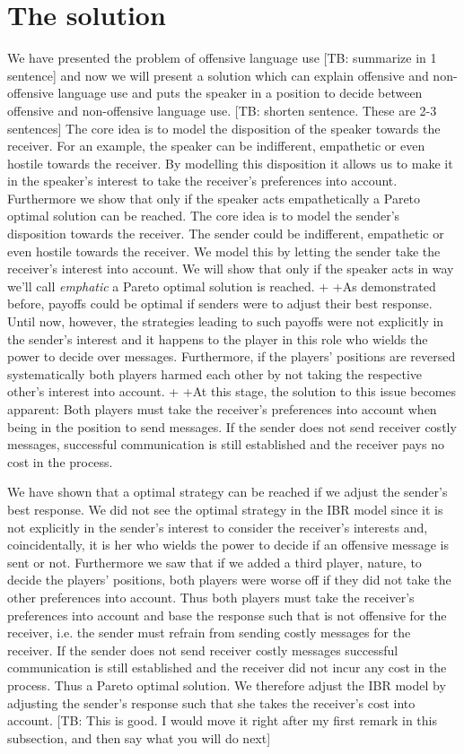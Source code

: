 \documentclass[10pt]{article}
\newcommand{\tb}[1]{\textcolor[rgb]{.8,.33,.0}{[TB: #1]}}%
\begin{document}
\section{The solution}
We have presented the problem of offensive language use \tb{summarize in 1 sentence} and now we will present a solution which can explain offensive and non-offensive language use and puts the speaker in a position to decide between offensive and non-offensive language use. \tb{shorten sentence. These are 2-3 sentences} The core idea is to model the disposition of the speaker towards the receiver. For an example, the speaker can be indifferent, empathetic or even hostile towards the receiver. By modelling this disposition it allows us to make it in the speaker's interest to take the receiver's preferences into account. Furthermore we show that only if the speaker acts empathetically a Pareto optimal solution can be reached.
The core idea is to model the sender's disposition towards the receiver. The sender could be indifferent, empathetic or even hostile towards the receiver. We model this by letting the sender take the receiver's interest into account. We will show that only if the speaker acts in way we'll call \textit{emphatic} a Pareto optimal solution is reached.
+
+As demonstrated before, payoffs could be optimal if senders were to adjust their best response. Until now, however, the strategies leading to such payoffs were not explicitly in the sender's interest and it happens to the player in this role who wields the power to decide over messages. Furthermore, if the players' positions are reversed systematically both players harmed each other by not taking the respective other's interest into account.
+
+At this stage, the solution to this issue becomes apparent: Both players must take the receiver's preferences into account when being in the position to send messages. If the sender does not send receiver costly messages, successful communication is still established and the receiver pays no cost in the process.

We have shown that a optimal strategy can be reached if we adjust the sender's best response. We did not see the optimal strategy in the IBR model since it is not explicitly in the sender's interest to consider the receiver's interests and, coincidentally, it is her who wields the power to decide if an offensive message is sent or not. Furthermore we saw that if we added a third player, nature, to decide the players' positions, both players were worse off if they did not take the other preferences into account. Thus both players must take the receiver's preferences into account and base the response such that is not offensive for the receiver, i.e. the sender must refrain from sending costly messages for the receiver. If the sender does not send receiver costly messages successful communication is still established and the receiver did not incur any cost in the process. Thus a Pareto optimal solution. We therefore adjust the IBR model by adjusting the sender's response such that she takes the receiver's cost into account. \tb{This is good. I would move it right after my first remark in this subsection, and then say what you will do next}
\end{document}
